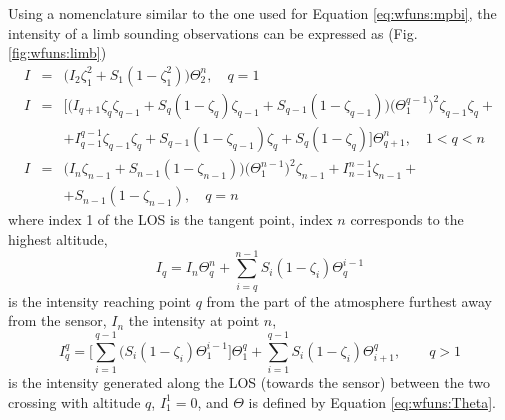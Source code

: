  Using a nomenclature similar to the one used for Equation
 \ref{eq:wfuns:mpbi}, the intensity of a limb sounding
 observations can be expressed as (Fig. \ref{fig:wfuns:limb})
 \begin{eqnarray}
   I & = & \Big(I_2\zeta_1^2+S_1(1-\zeta_1^2) \Big)\Theta^n_{2}, \quad q=1 
        \nonumber \\
   I & = & \Big[\Big(I_{q+1}\zeta_q\zeta_{q-1} +S_q(1-\zeta_q)\zeta_{q-1} + 
           S_{q-1}(1-\zeta_{q-1})\Big)\Big(\Theta^{q-1}_{1}\Big)^2
           \zeta_{q-1}\zeta_q + \nonumber \\
      & & + I_{q-1}^{q-1}\zeta_{q-1}\zeta_q + S_{q-1}(1-\zeta_{q-1})
           \zeta_q + S_q(1-\zeta_q) \Big] \Theta^n_{q+1}, \quad 1<q<n
  \label{eq:wfuns:limb1}  \\
   I & = & \Big(I_n\zeta_{n-1}+S_{n-1}(1-\zeta_{n-1})\Big)\Big
           (\Theta^{n-1}_{1}\Big)^2\zeta_{n-1} + I_{n-1}^{n-1}\zeta_{n-1} +
             \nonumber \\
      & &  +   S_{n-1}(1-\zeta_{n-1}), \quad q=n \nonumber
 \end{eqnarray}
 where index 1 of the LOS is the tangent point, index $n$ corresponds
 to the highest altitude, 
 \begin{equation}
   I_q = I_n \Theta^{n}_{q} + \sum_{i=q}^{n-1}S_i(1-\zeta_i) 
             \Theta_{q}^{i-1}
  \label{eq:wfuns:iqq}
 \end{equation}
 is the intensity reaching point $q$ from the part of the
 atmosphere furthest away from the sensor, $I_n$ the intensity at point $n$,
 \begin{equation}
   I_q^q = \Big[ \sum_{i=1}^{q-1}(S_i(1-\zeta_i)\Theta_{1}^{i-1}\Big]
             \Theta_{1}^{q} + \sum_{i=1}^{q-1}S_i(1-\zeta_i)
            \Theta_{i+1}^{q}, \qquad q>1
 \end{equation}
 is the intensity generated along the LOS (towards the sensor) between
 the two crossing with altitude $q$, $I_1^1=0$, and $\Theta$ is defined
 by Equation \ref{eq:wfuns:Theta}.

